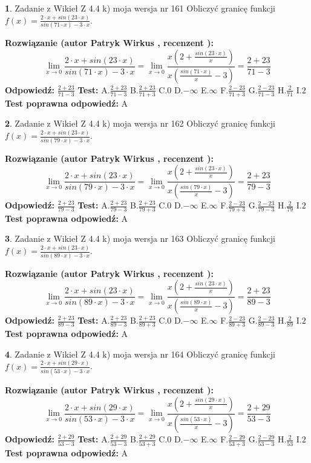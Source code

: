 \documentclass[12pt, a4paper]{article}
\theoremstyle{definition} %
\newtheorem{zad}{}
\newcommand{\zadStart}[1]{\begin{zad}#1\newline}
\newcommand{\zadStop}{\end{zad}}
\newcommand{\rozwStart}[2]{\noindent \textbf{Rozwiązanie (autor #1 , recenzent #2): }\newline}
\newcommand{\rozwStop}{\newline}
\newcommand{\odpStart}{\noindent \textbf{Odpowiedź:}\newline}
\newcommand{\odpStop}{\newline}
\newcommand{\testStart}{\noindent \textbf{Test:}\newline}
\newcommand{\testStop}{\newline}
\newcommand{\kluczStart}{\noindent \textbf{Test poprawna odpowiedź:}\newline}
\newcommand{\kluczStop}{\newline}
\begin{document}
\zadStart{Zadanie z Wikieł Z 4.4 k) moja wersja nr 161}
Obliczyć granicę funkcji $f(x)=\frac{2\cdot x +sin(23\cdot x)}{sin(71\cdot x) -3\cdot x}$.
\zadStop
\rozwStart{Patryk Wirkus}{}
$$\lim\limits_{x\to 0}\frac{2\cdot x +sin(23\cdot x)}{sin(71\cdot x) -3\cdot x}
=\lim\limits_{x\to 0}\frac{x(2+\frac{sin(23\cdot x)}{x})}{x(\frac{sin(71\cdot x)}{x}-3)}
=\frac{2+23}{71-3}$$
\rozwStop
\odpStart
$\frac{2+23}{71-3}$
\odpStop
\testStart
A.$\frac{2+23}{71-3}$
B.$\frac{2+23}{71+3}$
C.$0$
D.$-\infty$
E.$\infty$
F.$\frac{2-23}{71+3}$
G.$\frac{2-23}{71-3}$
H.$\frac{2}{71}$
I.$2$
\testStop
\kluczStart
A
\kluczStop



\zadStart{Zadanie z Wikieł Z 4.4 k) moja wersja nr 162}
Obliczyć granicę funkcji $f(x)=\frac{2\cdot x +sin(23\cdot x)}{sin(79\cdot x) -3\cdot x}$.
\zadStop
\rozwStart{Patryk Wirkus}{}
$$\lim\limits_{x\to 0}\frac{2\cdot x +sin(23\cdot x)}{sin(79\cdot x) -3\cdot x}
=\lim\limits_{x\to 0}\frac{x(2+\frac{sin(23\cdot x)}{x})}{x(\frac{sin(79\cdot x)}{x}-3)}
=\frac{2+23}{79-3}$$
\rozwStop
\odpStart
$\frac{2+23}{79-3}$
\odpStop
\testStart
A.$\frac{2+23}{79-3}$
B.$\frac{2+23}{79+3}$
C.$0$
D.$-\infty$
E.$\infty$
F.$\frac{2-23}{79+3}$
G.$\frac{2-23}{79-3}$
H.$\frac{2}{79}$
I.$2$
\testStop
\kluczStart
A
\kluczStop



\zadStart{Zadanie z Wikieł Z 4.4 k) moja wersja nr 163}
Obliczyć granicę funkcji $f(x)=\frac{2\cdot x +sin(23\cdot x)}{sin(89\cdot x) -3\cdot x}$.
\zadStop
\rozwStart{Patryk Wirkus}{}
$$\lim\limits_{x\to 0}\frac{2\cdot x +sin(23\cdot x)}{sin(89\cdot x) -3\cdot x}
=\lim\limits_{x\to 0}\frac{x(2+\frac{sin(23\cdot x)}{x})}{x(\frac{sin(89\cdot x)}{x}-3)}
=\frac{2+23}{89-3}$$
\rozwStop
\odpStart
$\frac{2+23}{89-3}$
\odpStop
\testStart
A.$\frac{2+23}{89-3}$
B.$\frac{2+23}{89+3}$
C.$0$
D.$-\infty$
E.$\infty$
F.$\frac{2-23}{89+3}$
G.$\frac{2-23}{89-3}$
H.$\frac{2}{89}$
I.$2$
\testStop
\kluczStart
A
\kluczStop



\zadStart{Zadanie z Wikieł Z 4.4 k) moja wersja nr 164}
Obliczyć granicę funkcji $f(x)=\frac{2\cdot x +sin(29\cdot x)}{sin(53\cdot x) -3\cdot x}$.
\zadStop
\rozwStart{Patryk Wirkus}{}
$$\lim\limits_{x\to 0}\frac{2\cdot x +sin(29\cdot x)}{sin(53\cdot x) -3\cdot x}
=\lim\limits_{x\to 0}\frac{x(2+\frac{sin(29\cdot x)}{x})}{x(\frac{sin(53\cdot x)}{x}-3)}
=\frac{2+29}{53-3}$$
\rozwStop
\odpStart
$\frac{2+29}{53-3}$
\odpStop
\testStart
A.$\frac{2+29}{53-3}$
B.$\frac{2+29}{53+3}$
C.$0$
D.$-\infty$
E.$\infty$
F.$\frac{2-29}{53+3}$
G.$\frac{2-29}{53-3}$
H.$\frac{2}{53}$
I.$2$
\testStop
\kluczStart
A
\kluczStop
\end{document}
